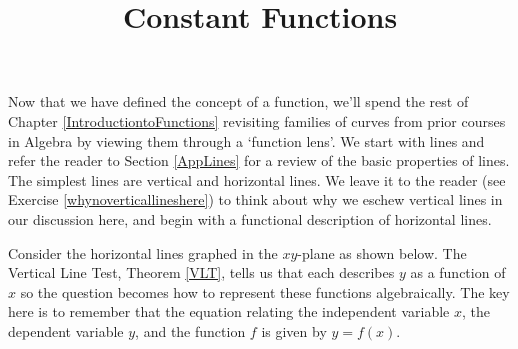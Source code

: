 \documentclass{ximera}
\title{Constant Functions} \license{CC BY-NC-SA 4.0}
\begin{document}
\begin{abstract}
\end{abstract}
\maketitle

Now that we have defined the concept of a function, we'll spend the rest of Chapter \ref{IntroductiontoFunctions} revisiting families of curves from prior courses in Algebra by viewing them through a `function lens'.  We start with lines and refer the reader to Section \ref{AppLines} for a review of the basic properties of lines.  The simplest lines are vertical and horizontal lines.  We leave it to the reader (see Exercise \ref{whynoverticallineshere}) to think about why we eschew vertical lines in our discussion here, and begin with a functional description of horizontal lines.  



Consider the horizontal lines graphed in the $xy$-plane as shown below. The Vertical Line Test, Theorem \ref{VLT}, tells us that each describes $y$ as a function of $x$ so the question becomes how to represent these functions algebraically. The key here is to remember that the equation relating the independent variable $x$,  the dependent variable  $y$, and the function $f$ is given by $y = f(x)$.
\end{document}
